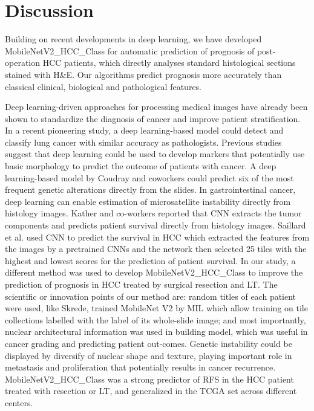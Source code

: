 \documentclass{article}
\begin{document}
\section{Discussion}
Building on recent developments in deep learning, we have developed MobileNetV2\_HCC\_Class for automatic prediction of prognosis of post-operation HCC patients, which directly analyses standard histological sections stained with H\&E. Our algorithms predict prognosis more accurately than classical clinical, biological and pathological features.

Deep learning-driven approaches for processing medical images have already been shown to standardize the diagnosis of cancer and improve patient stratification\cite{bejnordi2017diagnostic}\cite{niazi2019digital}. In a recent pioneering study, a deep learning-based model could detect and classify lung cancer with similar accuracy as pathologists\cite{coudray2018classification}. Previous studies suggest that deep learning could be used to develop markers that potentially use basic morphology to predict the outcome of patients with cancer\cite{mobadersany2018predicting}\cite{bychkov2018deep}. A deep learning-based model by Coudray and coworkers could predict six of the most frequent genetic alterations directly from the slides\cite{coudray2018classification}. In gastrointestinal cancer, deep learning can enable estimation of  microsatellite instability directly from histology images\cite{kather2019deep}. Kather and co-workers reported that CNN extracts the tumor components and predicts patient survival directly from histology images\cite{kather2019predicting}. Saillard et al. used CNN to predict the survival in HCC which extracted the features from the images by a pretrained CNNs and the network then selected 25 tiles with the highest and lowest scores for the prediction of patient survival\cite{saillard2020predicting}. In our study, a different method was used to develop MobileNetV2\_HCC\_Class to improve the prediction of prognosis in HCC treated by surgical resection and LT. The scientific or innovation points of our method are: random titles of each patient were used, like Skrede\cite{skrede2020deep}, trained MobileNet V2 by MIL which allow training on tile collections labelled with the label of its whole-slide image; and most importantly, nuclear architectural information was used in building model, which was useful in cancer grading and predicting patient out-comes\cite{ji2019nuclear}. Genetic instability could be displayed by diversify of nuclear shape and texture, playing important role in metastasis and proliferation that potentially results in cancer recurrence. MobileNetV2\_HCC\_Class was a strong predictor of RFS in the HCC patient treated with resection or LT, and generalized in the TCGA set across different centers.
\end{document}

